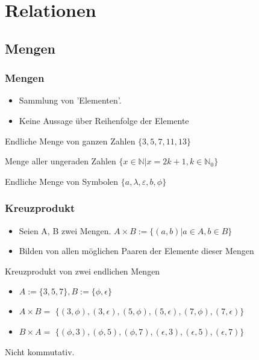 \section{Relationen}
\subsection{Mengen}
\begin{frame}
  \frametitle{Mengen}
  \begin{definition}
    \begin{itemize}
      \item Sammlung von 'Elementen'.
      \item Keine Aussage über Reihenfolge der Elemente
    \end{itemize}
  \end{definition} \pause
  \begin{exampleblock}{Endliche Menge von ganzen Zahlen}
    $\{ 3, 5, 7, 11, 13\}$
  \end{exampleblock} \pause
  \begin{exampleblock}{Menge aller ungeraden Zahlen }
    $\{ x \in \mathbb{N} | x = 2k + 1, k \in \mathbb{N}_0 \}$
  \end{exampleblock} \pause
  \begin{exampleblock}{Endliche Menge von Symbolen}
    $\{ a, \lambda, \varepsilon, b, \phi\}$
  \end{exampleblock}
\end{frame}
\begin{frame}
  \frametitle{Kreuzprodukt}
  \begin{definition}
    \begin{itemize}
      \item Seien A, B zwei Mengen. $ A \times B := \{(a, b) | a \in A, b \in B\}$
      \item Bilden von allen möglichen Paaren der Elemente dieser Mengen
    \end{itemize}
  \end{definition} \pause
  \begin{exampleblock}{Kreuzprodukt von zwei endlichen Mengen}
    \begin{itemize}
    \item $ A := \{3, 5, 7\}, B := \{\phi, \epsilon\}$
    \item $ A \times B = $ \pause $\{(3, \phi), (3, \epsilon), (5, \phi), (5, \epsilon), (7, \phi), (7, \epsilon)\}$
    \item $ B \times A = $ \pause $\{(\phi, 3), (\phi, 5), (\phi, 7), (\epsilon, 3), (\epsilon, 5), (\epsilon, 7)\}$
    \end{itemize}
  \end{exampleblock}
  \begin{alertblock}{Nicht kommutativ.}
  \end{alertblock}
\end{frame}
